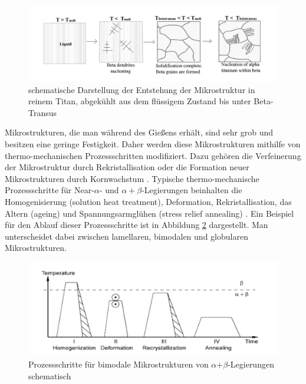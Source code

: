 \pagebreak

\begin{figure}[h]
	\centering
	\includegraphics[width=0.8\linewidth]{./Bilder/Abbildung 6.png}
	\caption[Abbildung 6]{schematische Darstellung der Entstehung der Mikrostruktur in reinem Titan, abgekühlt aus dem flüssigem Zustand bis unter Beta-Transus \cite{M.J.Berminghametal..2007}}
	\label{fig:abbildung-6}
\end{figure}


Mikrostrukturen, die man während des Gießens erhält, sind sehr grob und besitzen eine geringe Festigkeit. Daher werden diese Mikrostrukturen mithilfe von thermo-mechanischen Prozessschritten modifiziert. Dazu gehören die Verfeinerung der Mikrostruktur durch Rekristallisation oder die Formation neuer Mikrostrukturen durch Kornwachstum \cite{C.Leyens.2005,Lutjering.2007,Boyer.2007,M.J.Donachie.2010}.
Typische thermo-mechanische Prozessschritte für Near-$\alpha$- und $\alpha+\beta$-Legierungen beinhalten die Homogenisierung (solution heat treatment), Deformation, Rekristallisation, das Altern (ageing) und Spannungsarmglühen (stress relief annealing) \cite{C.Leyens.2005,Lutjering.2007,Boyer.2007}. Ein Beispiel für den Ablauf dieser Prozessschritte ist in Abbildung \ref{fig:abbildung-7} dargestellt. Man unterscheidet dabei zwischen lamellaren, bimodalen und globularen Mikrostrukturen. 

\begin{figure}[h]
	\centering
	\includegraphics[width=0.9\linewidth]{./Bilder/Abbildung 7.png}
	\caption[Abbildung 7]{Prozessschritte für bimodale Mikrostrukturen von $\alpha$+$\beta$-Legierungen schematisch \cite{M.PetersJ.KumpfertC.WardC.Leyens.2003}}
	\label{fig:abbildung-7}
\end{figure}

